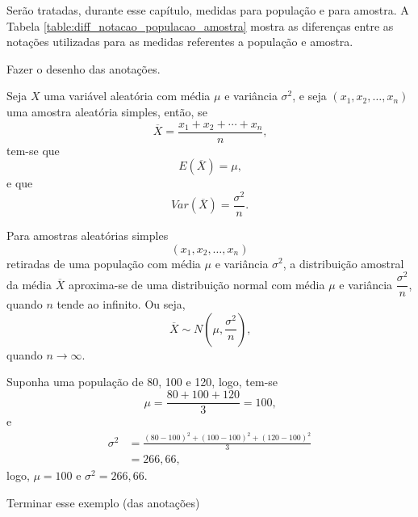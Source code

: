 \documentclass[11pt,fleqn]{book}
\numberwithin{mpicture}{chapter}
\numberwithin{mtable}{chapter}
\numberwithin{mframe}{chapter}
\begin{document}

Serão tratadas, durante esse capítulo, medidas para população e para amostra. A Tabela \ref{table:diff_notacao_populacao_amostra} mostra as diferenças entre as notações utilizadas para as medidas referentes a população e amostra.

{\color{red}Fazer o desenho das anotações.}

\begin{theorem}
	Seja $X$ uma variável aleatória com média $\mu$ e variância $\sigma^2$, e seja $(x_1,x_2,\dots,x_n)$ uma amostra aleatória simples, então, se
	\[
		\overline{X}=\frac{x_1+x_2+\cdots +x_n}{n}\text{,}
	\]
	tem-se que
	\[
		E(\overline{X})=\mu
		\text{,}
	\]
	e que
	\[
		Var(\overline{X})=\frac{\sigma^2}{n}
		\text{.}
	\]
\end{theorem}

\begin{theorem}
	Para amostras aleatórias simples
	\[
		(x_1,x_2,\dots,x_n)
	\]
	retiradas de uma população com média $\mu$ e variância $\sigma^2$, a distribuição amostral da média $\overline{X}$ aproxima-se de uma distribuição normal com média $\mu$ e variância $\dfrac{\sigma^2}{n}$, quando $n$ tende ao infinito. Ou seja,
	\[
		\overline{X}\sim N(\mu,\frac{\sigma^2}{n})\text{,}
	\]
	quando $n\to \infty$.
\end{theorem}

\begin{example}
	Suponha uma população de 80, 100 e 120, logo, tem-se
	\[
		\mu=\frac{80+100+120}{3}=100\text{,}
	\]
	e
	\begin{align*}
		\sigma^2&=\frac{(80-100)^2+(100-100)^2+(120-100)^2}{3}\\
				&=266,66\text{,}
	\end{align*}
	logo, $\mu=100$ e $\sigma^2=266,66$.
	
	{\color{red}Terminar esse exemplo (das anotações)}
\end{example}
\end{document}
